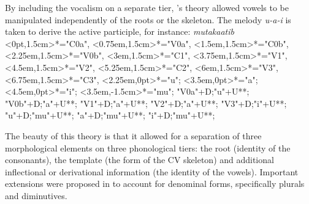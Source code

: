 By including the vocalism on a separate tier, \citeauthor{jjmcc81}'s theory allowed vowels to be manipulated independently of the roots or the skeleton. The melody \emph{u-a-i} is taken to derive the active participle, for {instance}:
\ex \emph{mutakaatib} \citep[401]{jjmcc81}\\
\xy
<0pt,1.5cm>*="C0a",
<0.75em,1.5cm>*="V0a",
<1.5em,1.5cm>*="C0b",
<2.25em,1.5cm>*="V0b",
<3em,1.5cm>*="C1",
<3.75em,1.5cm>*="V1",
<4.5em,1.5cm>*="V2",
<5.25em,1.5cm>*="C2",
<6em,1.5cm>*="V3",
<6.75em,1.5cm>*="C3",
<2.25em,0pt>*="u";
<3.5em,0pt>*="a";
<4.5em,0pt>*="i";
<3.5em,-1.5cm>*\asrnode{$\mu$}="mu";
"V0a"+D;"u"+U**\dir{-};
"V0b"+D;"a"+U**\dir{-};
"V1"+D;"a"+U**\dir{-};
"V2"+D;"a"+U**\dir{-};
"V3"+D;"i"+U**\dir{-};
"u"+D;"mu"+U**\dir{-};
"a"+D;"mu"+U**\dir{-};
"i"+D;"mu"+U**\dir{-};
\endxy
\xe

The beauty of this theory is that it allowed for a separation of three morphological elements on three phonological tiers: the root (identity of the consonants), the template (the form of the CV skeleton) and additional inflectional or derivational information (the identity of the vowels). Important extensions were proposed in \cite{jjmccprince90} to account for denominal forms, specifically plurals and diminutives.

